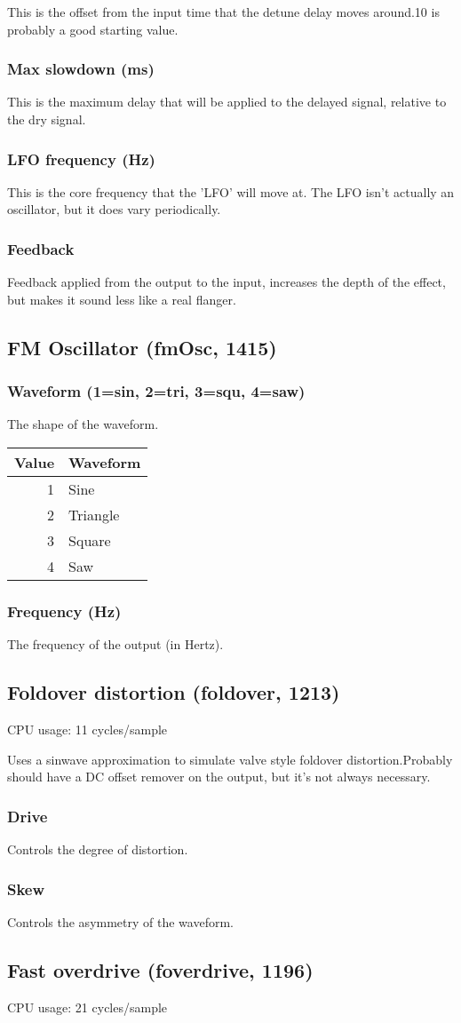 \documentclass[11pt]{article}
\begin{document}
This is the offset from the input time that the detune delay moves around.10 is probably a good starting value.\subsubsection*{Max slowdown (ms)}
This is the maximum delay that will be applied to the delayed signal, relative to the dry signal.\subsubsection*{LFO frequency (Hz)}
This is the core frequency that the 'LFO' will move at. The LFO isn't actually an oscillator, but it does vary periodically.\subsubsection*{Feedback}
Feedback applied from the output to the input, increases the depth of the effect, but makes it sound less like a real flanger.\subsection{FM Oscillator (fmOsc, 1415)\label{fmOsc}\label{id1415}}
\subsubsection*{Waveform (1=sin, 2=tri, 3=squ, 4=saw)}
The shape of the waveform.
	\begin{tabular}{|r|l|}
	\hline
	Value & Waveform \\
	\hline \hline
	1 & Sine \\
	2 & Triangle \\
	3 & Square \\
	4 & Saw \\
        \hline
	\end{tabular}
      \subsubsection*{Frequency (Hz)}
The frequency of the output (in Hertz).\subsection{Foldover distortion (foldover, 1213)\label{foldover}\label{id1213}}
CPU usage: 11 cycles/sample

Uses a sinwave approximation to simulate valve style foldover distortion.Probably should have a DC offset remover on the output, but it's not always necessary.\subsubsection*{Drive}
Controls the degree of distortion.\subsubsection*{Skew}
Controls the asymmetry of the waveform.\subsection{Fast overdrive (foverdrive, 1196)\label{foverdrive}\label{id1196}}
CPU usage: 21 cycles/sample
\end{document}

